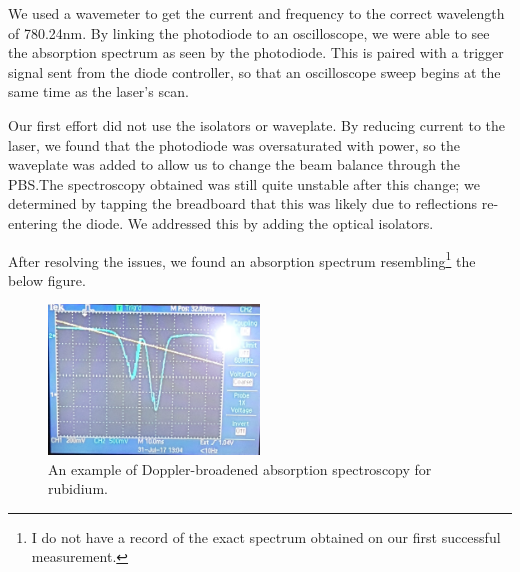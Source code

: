 \documentclass[11pt,twoside,a4paper]{article}
\begin{document}
We used a wavemeter to get the current and frequency to the correct wavelength of 780.24nm. By linking the photodiode to an oscilloscope, we were able to see the absorption
spectrum as seen by the photodiode. This is paired with a trigger signal sent from the diode controller, so that an oscilloscope sweep begins at the same time as the laser's
scan.

Our first effort did not use the isolators or waveplate. By reducing current to the laser, we found that the photodiode was oversaturated with power, so the waveplate
was added to allow us to change the beam balance through the PBS.\@ The spectroscopy obtained was still quite unstable after this change; we determined by tapping the
breadboard that this was likely due to reflections re-entering the diode. We addressed this by adding the optical isolators.

After resolving the issues, we found an absorption spectrum resembling\footnote{I do not have a record of the exact spectrum obtained on our first successful measurement.} the below figure.
\begin{figure}[h]
    \centering
    \includegraphics[width=0.5\textwidth]{images/broadened-spec}
    \caption{An example of Doppler-broadened absorption spectroscopy for rubidium.}
\end{figure}
\end{document}
